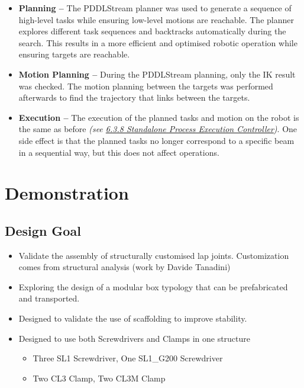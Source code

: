 \begin{itemize}
	\item \textbf{Planning --} The PDDLStream planner was used to generate a sequence of high-level tasks while ensuring low-level motions are reachable. The planner explores different task sequences and backtracks automatically during the search. This results in a more efficient and optimised robotic operation while ensuring targets are reachable.

	\item \textbf{Motion Planning --} During the PDDLStream planning, only the IK result was checked. The motion planning between the targets was performed afterwards to find the trajectory that links between the targets.

	\item \textbf{Execution --} The execution of the planned tasks and motion on the robot is the same as before \textit{(see \ul{6.3.8 Standalone Process Execution Controller})}. One side effect is that the planned tasks no longer correspond to a specific beam in a sequential way, but this does not affect operations.

\end{itemize}
\section{Demonstration}

\subsection{Design Goal}

\begin{itemize}
	\item Validate the assembly of structurally customised lap joints. Customization comes from structural analysis (work by Davide Tanadini)

	\item Exploring the design of a modular box typology that can be prefabricated and transported.

	\item Designed to validate the use of scaffolding to improve stability.

	\item Designed to use both Screwdrivers and Clamps in one structure

\begin{itemize}
	\item Three SL1 Screwdriver, One SL1\_G200 Screwdriver

	\item Two CL3 Clamp, Two CL3M Clamp

\end{itemize}
\end{itemize}
